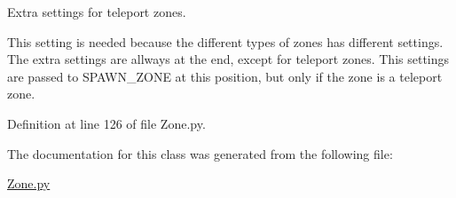 \-Extra settings for teleport zones. 

\-This setting is needed because the different types of zones has different settings. \-The extra settings are allways at the end, except for teleport zones. \-This settings are passed to \-S\-P\-A\-W\-N\-\_\-\-Z\-O\-N\-E at this position, but only if the zone is a teleport zone. 

\-Definition at line 126 of file \-Zone.\-py.



\-The documentation for this class was generated from the following file\-:\begin{DoxyCompactItemize}
\item 
\hyperlink{_zone_8py}{\-Zone.\-py}\end{DoxyCompactItemize}
